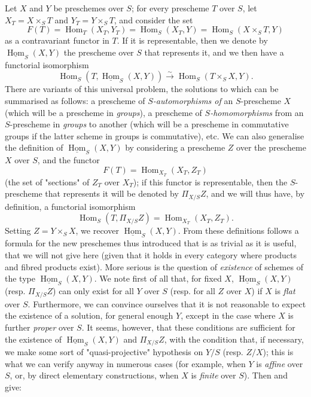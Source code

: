 Let $X$ and $Y$ be preschemes over $S$;
for every prescheme $T$ over $S$, let $X_T=X\times_S T$ and $Y_T=Y\times_S T$, and consider the set
\[
    F(T)
    = \operatorname{Hom}_T(X_T,Y_T)
    = \operatorname{Hom}_S(X_T,Y)
    = \operatorname{Hom}_S(X\times_S T,Y)
\]
as a contravariant functor in $T$.
If it is representable, then we denote by $\underline{\operatorname{Hom}}_S(X,Y)$ the prescheme over $S$ that represents it, and we then have a functorial isomorphism
\[
    \operatorname{Hom}_S(T,\underline{\operatorname{Hom}}_S(X,Y)) \xrightarrow{\sim} \operatorname{Hom}_S(T\times_S X,Y).
\]
There are variants of this universal problem, the solutions to which can be summarised as follows: a prescheme of \emph{$S$-automorphisms of} an $S$-prescheme $X$ (which will be a prescheme in \emph{groups}), a prescheme of \emph{$S$-homomorphisms} from an $S$-prescheme in \emph{groups} to another (which will be a prescheme in commutative groups if the latter scheme in groups is commutative), etc.
We can also generalise the definition of $\underline{\operatorname{Hom}}_S(X,Y)$ by considering a prescheme $Z$ over the prescheme $X$ over $S$, and the functor
\[
    F(T)
    = \operatorname{Hom}_{X_T}(X_T,Z_T)
\]
(the set of "sections" of $Z_T$ over $X_T$);
if this functor is representable, then the $S$-prescheme that represents it will be denoted by $\Pi_{X/S}Z$, and we will thus have, by definition, a functorial isomorphism
\[
    \operatorname{Hom}_S(T,\Pi_{X/S}Z)
    = \operatorname{Hom}_{X_T}(X_T,Z_T).
\]
Setting $Z=Y\times_S X$, we recover $\underline{\operatorname{Hom}}_S(X,Y)$.
From these definitions follows a formula for the new preschemes thus introduced that is as trivial as it is useful, that we will not give here (given that it holds in every category where products and fibred products exist).
More serious is the question of \emph{existence} of schemes of the type $\underline{\operatorname{Hom}}_S(X,Y)$.
We note first of all that, for fixed $X$, $\underline{\operatorname{Hom}}_S(X,Y)$ (resp. $\Pi_{X/S}Z$) can only exist for all $Y$ over $S$ (resp. for all $Z$ over $X$) if $X$ is \emph{flat} over $S$.
Furthermore, we can convince ourselves that it is not reasonable to expect the existence of a solution, for general enough $Y$, except in the case where $X$ is further \emph{proper} over $S$.
It seems, however, that these conditions are sufficient for the existence of $\underline{\operatorname{Hom}}_S(X,Y)$ and $\Pi_{X/S}Z$, with the condition that, if necessary, we make some sort of "quasi-projective" hypothesis on $Y/S$ (resp. $Z/X$);
this is what we can verify anyway in numerous cases (for example, when $Y$ is \emph{affine} over $S$, or, by direct elementary constructions, when $X$ is \emph{finite} over $S$).
Then  and  give:

